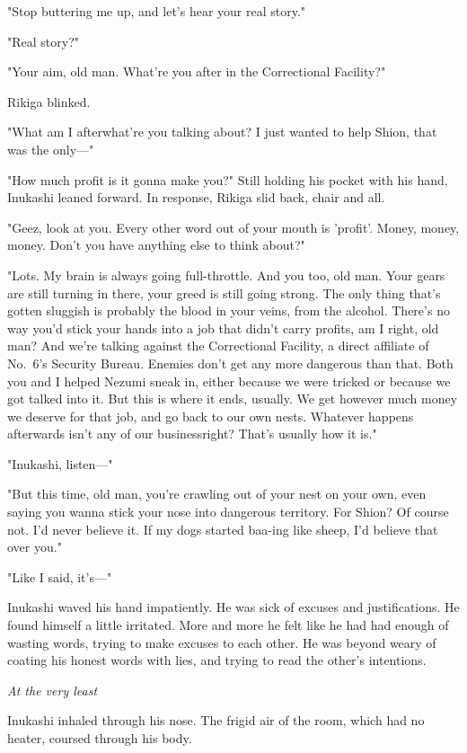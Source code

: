"Stop buttering me up, and let's hear your real story."

"Real story?"

"Your aim, old man. What're you after in the Correctional Facility?"

Rikiga blinked.

"What am I after\el what're you talking about? I just wanted to help
Shion, that was the only---"

"How much profit is it gonna make you?" Still holding his pocket with
his hand, Inukashi leaned forward. In response, Rikiga slid back, chair
and all.

"Geez, look at you. Every other word out of your mouth is 'profit'.
Money, money, money. Don't you have anything else to think about?"

"Lots. My brain is always going full-throttle. And you too, old man.
Your gears are still turning in there, your greed is still going strong.
The only thing that's gotten sluggish is probably the blood in your
veins, from the alcohol. There's no way you'd stick your hands into a
job that didn't carry profits, am I right, old man? And we're talking
against the Correctional Facility, a direct affiliate of No.~6's
Security Bureau. Enemies don't get any more dangerous than that. Both
you and I helped Nezumi sneak in, either because we were tricked or
because we got talked into it. But this is where it ends, usually. We
get however much money we deserve for that job, and go back to our own
nests. Whatever happens afterwards isn't any of our business\el right?
That's usually how it is."

"Inukashi, listen---"

"But this time, old man, you're crawling out of your nest on your own,
even saying you wanna stick your nose into dangerous territory. For
Shion? Of course not. I'd never believe it. If my dogs started baa-ing
like sheep, I'd believe that over you."

"Like I said, it's---"

Inukashi waved his hand impatiently. He was sick of excuses and
justifications. He found himself a little irritated. More and more he
felt like he had had enough of wasting words, trying to make excuses to
each other. He was beyond weary of coating his honest words with lies,
and trying to read the other's intentions.

\emph{At the very least\el }

Inukashi inhaled through his nose. The frigid air of the room, which had
no heater, coursed through his body.

